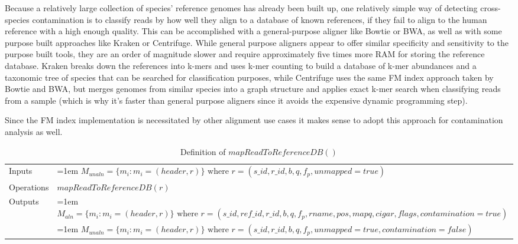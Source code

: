Because a relatively large collection of species' reference genomes has already been built up, one relatively simple way of detecting cross-species contamination is to classify reads by how well they align to a database of known references, if they fail to align to the human reference with a high enough quality. This can be accomplished with a general-purpose aligner like Bowtie or BWA, as well as with some purpose built approaches like Kraken\autocite{wood2014kraken} or Centrifuge\autocite{kim2016centrifuge}. While general purpose aligners appear to offer similar specificity and sensitivity to the purpose built tools, they are an order of magnitude slower and require approximately five times more RAM for storing the reference database\autocite{kim2016centrifuge}. Kraken breaks down the references into k-mers and uses k-mer counting to build a database of k-mer abundances and a taxonomic tree of species that can be searched for classification purposes, while Centrifuge uses the same FM index approach taken by Bowtie and BWA, but merges genomes from similar species into a graph structure and applies exact k-mer search when classifying reads from a sample (which is why it's faster than general purpose aligners since it avoids the expensive dynamic programming step).

Since the FM index implementation is necessitated by other alignment use cases it makes sense to adopt this approach for contamination analysis as well. 

\bgroup
\def\arraystretch{1.5}
\begin{table}[!ht]
    \caption{Definition of $mapReadToReferenceDB()$}
    \label{tab:op_map_pair_to_reference_db}
    {\begin{tabular}{l|p{12cm}}
    \toprule
    Inputs & \hangindent=1em $M_{unaln} = \{m_i: m_i = (header, r)\} \text{  where } r = (s\_id, r\_id, b, q, f_p, unmapped=true)$\\
    \cline{2-2}
    Operations & $mapReadToReferenceDB(r)$\\
    \cline{2-2}
    \multirow{2}{*}{Outputs} & \hangindent=1em$M_{aln} = \{m_i: m_i = (header, r)\} \text{ where } r = (s\_id, ref\_id, r\_id, b, q, f_p, rname, pos, mapq, cigar, flags, contamination=true)$\\
    & \hangindent=1em $M_{unaln} = \{m_i: m_i = (header, r)\} \text{  where } r = (s\_id, r\_id, b, q, f_p, unmapped=true, contamination=false)$\\
    \bottomrule
    \end{tabular}}
\end{table}
\egroup

